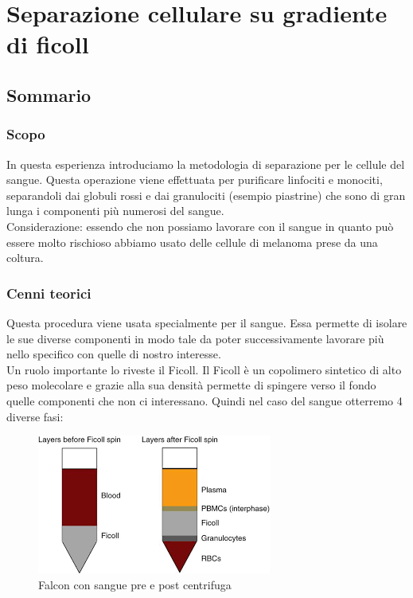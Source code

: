 \chapter{Separazione cellulare su gradiente di ficoll}

\vspace{0.6cm}

\section{Sommario}

\subsection{Scopo}

In questa esperienza introduciamo la metodologia di separazione per le cellule del sangue.
Questa operazione viene effettuata per purificare linfociti e monociti,
separandoli dai globuli rossi e dai granulociti (esempio piastrine) che sono di gran
lunga i componenti più numerosi del sangue.\\
Considerazione: essendo che non possiamo lavorare con il sangue in quanto può
essere molto rischioso abbiamo usato delle cellule di melanoma prese da una coltura.


\subsection{Cenni teorici}
Questa procedura viene usata specialmente per il sangue.
Essa permette di isolare le sue diverse componenti in modo tale da poter successivamente
lavorare più nello specifico con quelle di nostro interesse.\\
Un ruolo importante lo riveste il Ficoll.
Il Ficoll è un copolimero sintetico di alto peso molecolare e grazie alla sua densità
permette di spingere verso il fondo quelle componenti che non ci interessano.
Quindi nel caso del sangue otterremo 4 diverse fasi:
\begin{figure}[H]
    \centering
    \includegraphics{./immagini/Ficoll_sangue.png}
    \caption{Falcon con sangue pre e post centrifuga}
\end{figure}


